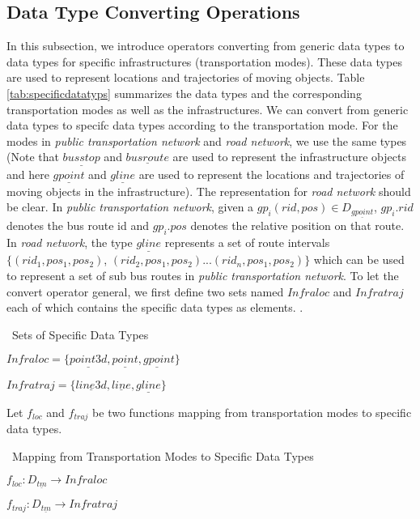 \subsection{Data Type Converting Operations}
\label{sec:datatypeconvert}
In this subsection, we introduce operators converting from generic data types to data types for specific infrastructures (transportation modes). These data types are used to represent locations and trajectories of moving objects. Table \ref{tab:specificdatatyps} summarizes the data types and the corresponding transportation modes as well as the infrastructures. 
We can convert from generic data types to specifc data types according to the transportation mode. 
For the modes in \textit{public transportation network} and \textit{road network}, we use the same types (Note that $\underline{busstop}$ and $\underline{busroute}$ are used to represent the infrastructure objects and here $\underline{gpoint}$ and $\underline{gline}$ are used to represent the locations and trajectories of moving objects in the infrastructure). The representation for \textit{road network} should be clear. In \textit{public transportation network}, given a $gp_i(rid,pos)\in D_{\underline{gpoint}}$, $gp_i.rid$ denotes the bus route id and $gp_i.pos$ denotes the relative position on that route. In \textit{road network}, the type $\underline{gline}$ represents a set of route intervals $\{(rid_1,pos_1,pos_2)$, $(rid_2,pos_1,pos_2)$...$(rid_n,pos_1,pos_2)\}$ which can be used to represent a set of sub bus routes in \textit{public transportation network}. To let the convert operator general, we first define two sets named $Infraloc$ and $Infratraj$ each of which contains the specific data types as elements. . 

\begin{Statement}
\label{infrastructureloctraj}
\ Sets of Specific Data Types 

$Infraloc = \{\underline{point3d},\underline{point},\underline{gpoin}t\}$

$Infratraj = \{\underline{line3d},\underline{line},\underline{gline}\}$
\end{Statement}

Let $f_{loc}$ and $f_{traj}$ be two functions mapping from transportation modes to specific data types. \\

\begin{Statement}
\label{convertfunction}
\ Mapping from Transportation Modes to Specific Data Types 

$f_{loc}: D_{\underline{tm}} \rightarrow Infraloc$ 

$f_{traj}: D_{\underline{tm}} \rightarrow Infratraj$
\end{Statement}


